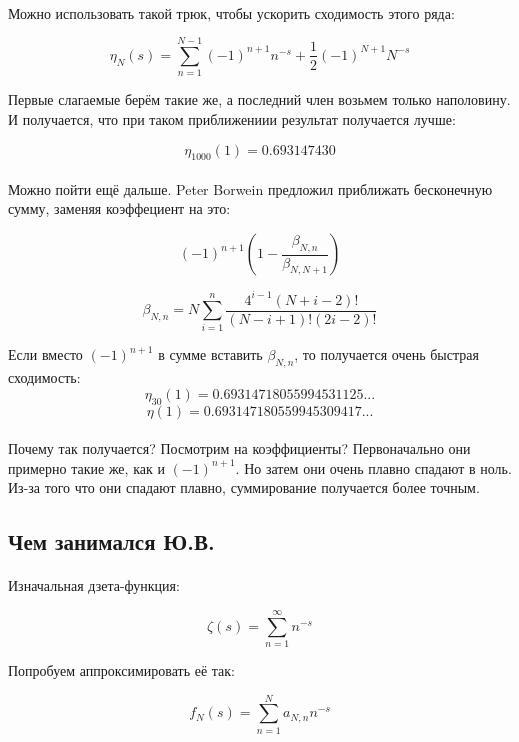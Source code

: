 \documentclass{article}
\begin{document}
\paragraph{}
Можно использовать такой трюк, чтобы ускорить сходимость этого ряда:

$$
    \eta_N(s) = \sum_{n=1}^{N-1} (-1)^{n+1} n^{-s} + \frac{1}{2}(-1)^{N+1} N^{-s}
$$

Первые слагаемые берём такие же, а последний член возьмем только наполовину.
И получается, что при таком приближениии результат получается лучше:

$$ \eta_{1000}(1) = 0.693147430 $$

\paragraph{}
Можно пойти ещё дальше. Peter Borwein предложил приближать бесконечную сумму,
заменяя коэффециент на это:

$$
    (-1)^{n+1} (1 - \frac{\beta_{N,n}}{\beta_{N,N+1}})
$$

$$
    \beta_{N,n} = N \sum_{i=1}^{n} \frac{4^{i-1} (N + i - 2)!}{(N - i + 1)! (2i - 2)!}
$$

Если вместо $(-1)^{n+1}$ в сумме вставить $\beta_{N,n}$, то получается очень
быстрая сходимость:
$$\eta_{30}(1) = 0.69314718055994531125...$$
$$\eta(1) = 0.693147180559945309417...$$

\paragraph{}
Почему так получается? Посмотрим на коэффициенты?
Первоначально они примерно такие же, как и $(-1)^{n+1}$. Но затем они очень плавно
спадают в ноль. Из-за того что они спадают плавно, суммирование получается более точным.

\subsection{Чем занимался Ю.В.}

\paragraph{}
Изначальная дзета-функция:

$$
    \zeta(s) = \sum_{n=1}^{\infty} n^{-s}
$$

Попробуем аппроксимировать её так:

$$
    f_N(s) = \sum_{n=1}^{N} a_{N,n} n^{-s}
$$
\end{document}
